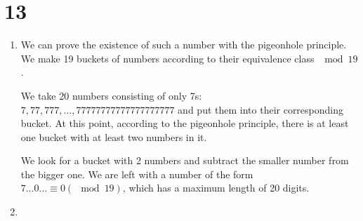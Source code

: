 \documentclass[12pt]{article}
\begin{document}
\section*{13}
\begin{enumerate}[a]
	\item %
	We can prove the existence of such a number with the pigeonhole principle. We make 19 buckets of numbers according to their equivalence class $\mod 19$.

	We take 20 numbers consisting of only 7s: $7, 77, 777, \dots, 77777777777777777777$ and put them into their corresponding bucket. At this point, according to the pigeonhole principle, there is at least one bucket with at least two numbers in it.

	We look for a bucket with 2 numbers and subtract the smaller number from the bigger one. We are left with a number of the form $7 \dots 0 \dots \equiv 0 (\mod 19)$, which has a maximum length of 20 digits.

	\item %
\end{enumerate}
\end{document}
